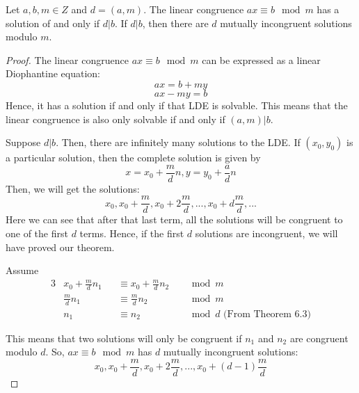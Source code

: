 \documentclass[12pt,letterpaper]{amsbook}
\theoremstyle{definition}
\begin{document}
\begin{theorem}
  Let $a,b,m \in Z$ and $d = (a,m)$. The linear congruence $ax \equiv b \mod m$ has a solution of and only if $d | b$. If $d | b$, then there are $d$ mutually incongruent solutions modulo $m$.
\end{theorem}
\begin{proof}
  The linear congruence $ax \equiv b \mod m$ can be expressed as a linear Diophantine equation:
  \[ax = b + my\]
  \[ax - my = b\]
  Hence, it has a solution if and only if that LDE is solvable. This means that the linear congruence is also only solvable if and only if $(a,m) | b$.

  Suppose $d|b$. Then, there are infinitely many solutions to the LDE. If $(x_0,y_0)$ is a particular solution, then the complete solution is given by
  \[x = x_0 + \frac{m}{d}n, y = y_0 + \frac{a}{d}n\]
  Then, we will get the solutions:
\[x_0, x_0 + \frac{m}{d}, x_0 + 2\frac{m}{d},...,x_0 + d\frac{m}{d},...\]
Here we can see that after that last term, all the solutions will be congruent to one of the first $d$ terms. Hence, if the first $d$ solutions are incongruent, we will have proved our theorem.

Assume 
\begin{alignat*}{3}
  &x_0 + \frac{m}{d}n_1 &&\equiv x_0 + \frac{m}{d} n_2 &&\mod m \\
  &\frac{m}{d}n_1 &&\equiv \frac{m}{d}n_2 &&\mod m \\
  &n_1 &&\equiv n_2 &&\mod d \text{ (From Theorem 6.3)}
\end{alignat*}

This means that two solutions will only be congruent if $n_1$ and $n_2$ are congruent modulo $d$. So, $ax \equiv b \mod m$ has $d$ mutually incongruent solutions:
\[x_0,x_0 + \frac{m}{d}, x_0 + 2\frac{m}{d},..., x_0 + (d-1)\frac{m}{d}\]
\end{proof}
\end{document}
